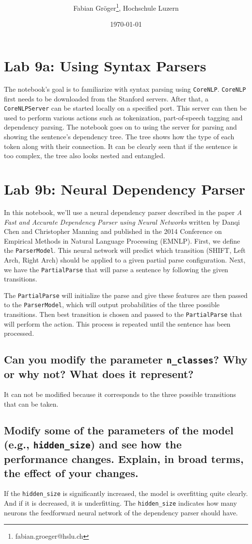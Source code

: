 \documentclass[onecolumn]{article}
\title{\vspace{-3cm}\spacecaps{Lab report: Week 9 }\\ \normalsize \spacesc{TSM\_AnTeDe} }
\author{Fabian Gröger\thanks{fabian.groeger@hslu.ch}, Hochschule Luzern}
\date{\today}
\begin{document}
\maketitle

\section{Lab 9a: Using Syntax Parsers}
The notebook's goal is to familiarize with syntax parsing using \texttt{CoreNLP}. \texttt{CoreNLP} first needs to be downloaded from the Stanford servers. After that, a \texttt{CoreNLPServer} can be started locally on a specified port. This server can then be used to perform various actions such as tokenization, part-of-speech tagging and dependency parsing. The notebook goes on to using the server for parsing and showing the sentence's dependency tree. The tree shows how the type of each token along with their connection. It can be clearly seen that if the sentence is too complex, the tree also looks nested and entangled.

\section{Lab 9b: Neural Dependency Parser}
In this notebook, we'll use a neural dependency parser described in the paper \textit{A Fast and Accurate Dependency Parser using Neural Networks} written by Danqi Chen and Christopher Manning and published in the 2014 Conference on Empirical Methods in Natural Language Processing (EMNLP). First, we define the \texttt{ParserModel}. This neural network will predict which transition (SHIFT, Left Arch, Right Arch) should be applied to a given partial parse configuration. Next, we have the \texttt{PartialParse} that will parse a sentence by following the given transitions. 

The \texttt{PartialParse} will initialize the parse and give these features are then passed to the \texttt{ParserModel}, which will output probabilities of the three possible transitions. Then best transition is chosen and passed to the \texttt{PartialParse} that will perform the action. This process is repeated until the sentence has been processed.

\subsection{Can you modify the parameter \texttt{n\_classes}? Why or why not? What does it represent?}
It can not be modified because it corresponds to the three possible transitions that can be taken.

\subsection{Modify some of the parameters of the model (e.g., \texttt{hidden\_size}) and see how the performance changes. Explain, in broad terms, the effect of your changes.}
If the \texttt{hidden\_size} is significantly increased, the model is overfitting quite clearly. And if it is decreased, it is underfitting. The \texttt{hidden\_size} indicates how many neurons the feedforward neural network of the dependency parser should have. 
\end{document}
